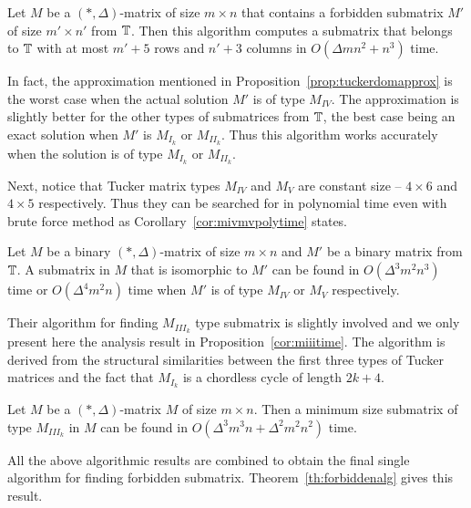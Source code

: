 \begin{proposition} 
  \label{prop:tuckerdomapprox}
  Let $M$ be a $(*,\Delta)$-matrix of size $m \times n$ that contains
  a forbidden submatrix $M'$ of size $m' \times n'$ from $\mathbb{T}$. Then
  this algorithm computes a submatrix that belongs to $\mathbb{T}$
  with at most $m'+5$ rows and $n'+3$ columns in $O(\Delta m n^2 +
  n^3)$ time.
\end{proposition}

In fact, the approximation mentioned in
Proposition~\ref{prop:tuckerdomapprox} is the worst case when
the actual solution $M'$ is of type $M_{IV}$. The approximation is
slightly better for the other types of submatrices from $\mathbb{T}$,
the best case being an exact solution when $M'$ is $M_{I_k}$ or
$M_{II_k}$. Thus this algorithm works accurately when the solution is of
type $M_{I_k}$ or $M_{II_k}$.

Next, notice that Tucker matrix types $M_{IV}$ and $M_{V}$ are
constant size -- $4 \times 6$ and $4 \times 5$ respectively. Thus they
can be searched for in polynomial time even with brute force method as
Corollary~\ref{cor:mivmvpolytime} states.

\begin{corollary} 
  \label{cor:mivmvpolytime}
  Let $M$ be a binary $(*, \Delta)$-matrix of size $m \times n$ and
  $M'$ be a binary matrix from $\mathbb{T}$. A submatrix in $M$ that
  is isomorphic to $M'$ can be found in $O(\Delta^3m^2n^3)$ time or
  $O(\Delta^4m^2n)$ time when $M'$ is of type $M_{IV}$ or $M_V$
  respectively.
\end{corollary}

Their algorithm for finding $M_{III_k}$ type submatrix is slightly
involved and we only present here the analysis result in
Proposition~\ref{cor:miiitime}. The algorithm is derived from the
structural similarities between the first three types of Tucker
matrices and the fact that $M_{I_k}$ is a chordless cycle of length
$2k+4$.

\begin{proposition} 
  \label{cor:miiitime}
  Let $M$ be a $(*,\Delta)$-matrix $M$ of size $m \times n$. Then a
  minimum size submatrix of type $M_{III_k}$ in $M$ can be found in
  $O(\Delta^3m^3n+\Delta^2m^2n^2)$ time.
\end{proposition}

All the above algorithmic results are combined to obtain the final
single algorithm for finding forbidden
submatrix. Theorem~\ref{th:forbiddenalg} gives this result.

